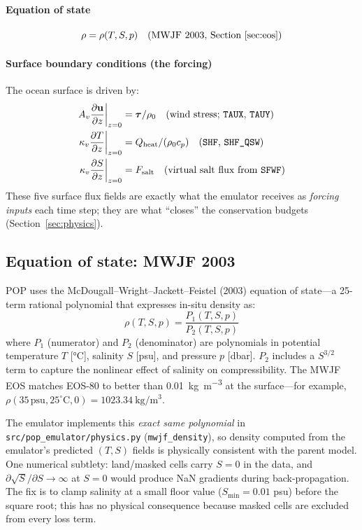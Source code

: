 \documentclass[11pt]{article}
\begin{document}
\paragraph{Equation of state}
\begin{equation}
\rho = \rho(T, S, p)
\quad\text{(MWJF 2003, Section~\ref{sec:eos})}
\end{equation}

\paragraph{Surface boundary conditions (the forcing)}
The ocean surface is driven by:
\begin{align}
A_v\frac{\partial\mathbf{u}}{\partial z}\bigg|_{z=0}
  &= \boldsymbol{\tau}/\rho_0
  \quad\text{(wind stress; \texttt{TAUX}, \texttt{TAUY})}\\
\kappa_v\frac{\partial T}{\partial z}\bigg|_{z=0}
  &= Q_\text{heat}/(\rho_0 c_p)
  \quad\text{(\texttt{SHF}, \texttt{SHF\_QSW})}\\
\kappa_v\frac{\partial S}{\partial z}\bigg|_{z=0}
  &= F_\text{salt}
  \quad\text{(virtual salt flux from \texttt{SFWF})}
\end{align}
These five surface flux fields are exactly what the emulator receives as
\emph{forcing inputs} each time step; they are what ``closes'' the
conservation budgets (Section~\ref{sec:physics}).

\subsection{Equation of state: MWJF 2003}
\label{sec:eos}
POP uses the McDougall--Wright--Jackett--Feistel (2003) equation of state---a
25-term rational polynomial that expresses in-situ density as:
\begin{equation}
\rho(T, S, p) = \frac{P_1(T, S, p)}{P_2(T, S, p)}
\label{eq:mwjf}
\end{equation}
where $P_1$ (numerator) and $P_2$ (denominator) are polynomials in
potential temperature $T$ [\si{\degreeCelsius}], salinity $S$ [psu], and
pressure $p$ [dbar]. $P_2$ includes a $S^{3/2}$ term to capture the
nonlinear effect of salinity on compressibility. The MWJF EOS matches
EOS-80 to better than \SI{0.01}{\kilogram\per\metre\cubed} at the
surface---for example, $\rho(35\,\text{psu}, 25^{\circ}\text{C}, 0) =
\SI{1023.34}{\kilogram\per\metre\cubed}$.

The emulator implements this \emph{exact same polynomial} in
\texttt{src/pop\_emulator/physics.py} (\texttt{mwjf\_density}), so density
computed from the emulator's predicted $(T,S)$ fields is physically consistent
with the parent model. One numerical subtlety: land/masked cells carry
$S=0$ in the data, and $\partial\sqrt{S}/\partial S\to\infty$ at
$S=0$ would produce NaN gradients during back-propagation. The fix is to
clamp salinity at a small floor value ($S_\text{min}=0.01$ psu) before the
square root; this has no physical consequence because masked cells are
excluded from every loss term.
\end{document}
